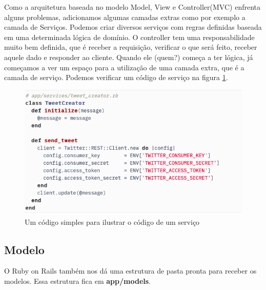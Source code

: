 Como a arquitetura baseada no modelo Model, View e Controller(MVC) enfrenta alguns problemas, adicionamos algumas camadas extras como por exemplo a camada de Serviços. Podemos criar diversos serviços com regras definidas baseada em uma determinada lógica de domínio. O controller tem uma responsabilidade muito bem definida, que é receber a requisição, verificar o que será feito, receber aquele dado e responder ao cliente. Quando ele (quem?) começa a ter lógica, já começamos a ver um espaço para a utilização de uma camada extra, que é a camada de serviço. Podemos verificar um código de serviço na figura \ref{fig:service-camadas}.


\begin{figure}[htbp]
\hypertarget{arquitetura}{%
\caption{ Um código simples para ilustrar o código de um serviço }
\begin{center}
\includegraphics[width=15cm]{Monografia-FormatoLatex/Imagens/examplo-camada-service.png}
\end{center}
}
\label{fig:service-camadas}
\end{figure}



\subsection{Modelo}
O Ruby on Rails também nos dá uma estrutura de pasta pronta para receber os modelos. Essa estrutura fica em \textbf{app/models}.

